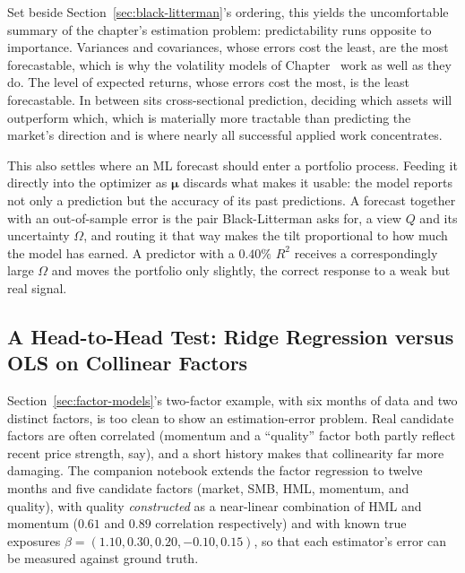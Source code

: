 \documentclass[../ai_in_finance]{subfiles}
\begin{document}
Set beside Section~\ref{sec:black-litterman}'s ordering, this yields the uncomfortable summary of the chapter's estimation problem: predictability runs opposite to importance. Variances and covariances, whose errors cost the least, are the most forecastable, which is why the volatility models of Chapter~ work as well as they do. The level of expected returns, whose errors cost the most, is the least forecastable. In between sits cross-sectional prediction, deciding which assets will outperform which, which is materially more tractable than predicting the market's direction and is where nearly all successful applied work concentrates.

This also settles where an ML forecast should enter a portfolio process. Feeding it directly into the optimizer as $\boldsymbol\mu$ discards what makes it usable: the model reports not only a prediction but the accuracy of its past predictions. A forecast together with an out-of-sample error is the pair Black-Litterman asks for, a view $Q$ and its uncertainty $\Omega$, and routing it that way makes the tilt proportional to how much the model has earned. A predictor with a $0.40\%$ $R^2$ receives a correspondingly large $\Omega$ and moves the portfolio only slightly, the correct response to a weak but real signal.

\subsection{A Head-to-Head Test: Ridge Regression versus OLS on Collinear Factors}
\label{sec:ml-factor-ridge}

Section~\ref{sec:factor-models}'s two-factor example, with six months of data and two distinct factors, is too clean to show an estimation-error problem. Real candidate factors are often correlated (momentum and a ``quality'' factor both partly reflect recent price strength, say), and a short history makes that collinearity far more damaging.
The companion notebook extends the factor regression to twelve months and five candidate factors (market, SMB, HML, momentum, and quality), with quality \emph{constructed} as a near-linear combination of HML and momentum ($0.61$ and $0.89$ correlation respectively) and with known true exposures $\beta=(1.10, 0.30, 0.20, -0.10, 0.15)$, so that each estimator's error can be measured against ground truth.
\end{document}
